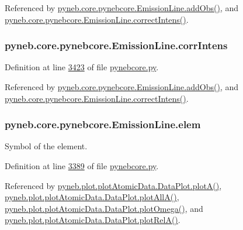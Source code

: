 Referenced by \hyperlink{pynebcore_8py_source_l03469}{pyneb.\-core.\-pynebcore.\-Emission\-Line.\-add\-Obs()}, and \hyperlink{pynebcore_8py_source_l03447}{pyneb.\-core.\-pynebcore.\-Emission\-Line.\-correct\-Intens()}.

\hypertarget{classpyneb_1_1core_1_1pynebcore_1_1_emission_line_a903ce14847b8b13f154d734ffe85c93a}{
\subsubsection[{corr\-Intens}]{\setlength{\rightskip}{0pt plus 5cm}pyneb.\-core.\-pynebcore.\-Emission\-Line.\-corr\-Intens}}\label{classpyneb_1_1core_1_1pynebcore_1_1_emission_line_a903ce14847b8b13f154d734ffe85c93a}


Definition at line \hyperlink{pynebcore_8py_source_l03423}{3423} of file \hyperlink{pynebcore_8py_source}{pynebcore.\-py}.



Referenced by \hyperlink{pynebcore_8py_source_l03469}{pyneb.\-core.\-pynebcore.\-Emission\-Line.\-add\-Obs()}, and \hyperlink{pynebcore_8py_source_l03447}{pyneb.\-core.\-pynebcore.\-Emission\-Line.\-correct\-Intens()}.

\hypertarget{classpyneb_1_1core_1_1pynebcore_1_1_emission_line_a2ae6c54e37a06730bf2b382c966a4694}{
\subsubsection[{elem}]{\setlength{\rightskip}{0pt plus 5cm}pyneb.\-core.\-pynebcore.\-Emission\-Line.\-elem}}\label{classpyneb_1_1core_1_1pynebcore_1_1_emission_line_a2ae6c54e37a06730bf2b382c966a4694}


Symbol of the element. 



Definition at line \hyperlink{pynebcore_8py_source_l03389}{3389} of file \hyperlink{pynebcore_8py_source}{pynebcore.\-py}.



Referenced by \hyperlink{plot_atomic_data_8py_source_l00117}{pyneb.\-plot.\-plot\-Atomic\-Data.\-Data\-Plot.\-plot\-A()}, \hyperlink{plot_atomic_data_8py_source_l00189}{pyneb.\-plot.\-plot\-Atomic\-Data.\-Data\-Plot.\-plot\-All\-A()}, \hyperlink{plot_atomic_data_8py_source_l00373}{pyneb.\-plot.\-plot\-Atomic\-Data.\-Data\-Plot.\-plot\-Omega()}, and \hyperlink{plot_atomic_data_8py_source_l00262}{pyneb.\-plot.\-plot\-Atomic\-Data.\-Data\-Plot.\-plot\-Rel\-A()}.

